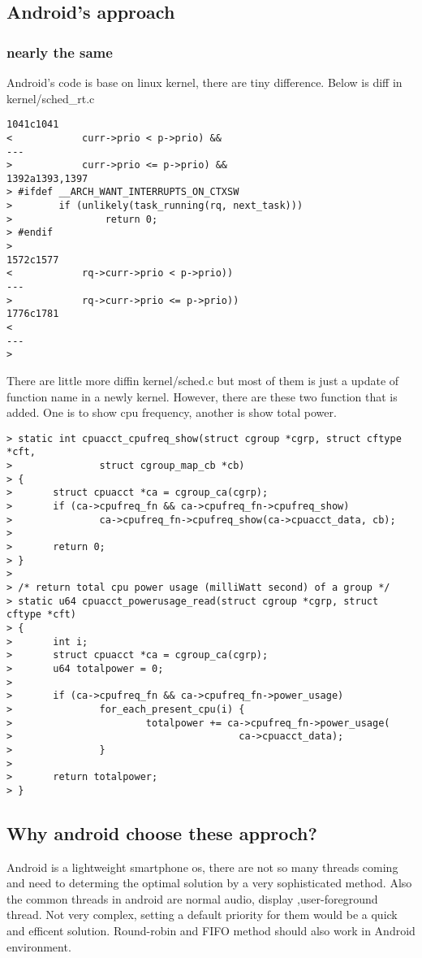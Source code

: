 \documentclass[12pt,letterpaper]{article}
\begin{document}
\subsection{Android's approach}
\subsubsection{nearly the same}
Android's code is base on linux kernel, there are tiny difference. Below is diff in kernel/sched_rt.c
\begin{Verbatim}[frame=single]
1041c1041
<            curr->prio < p->prio) &&
---
>            curr->prio <= p->prio) &&
1392a1393,1397
> #ifdef __ARCH_WANT_INTERRUPTS_ON_CTXSW
>        if (unlikely(task_running(rq, next_task)))
>                return 0;
> #endif
> 
1572c1577
<            rq->curr->prio < p->prio))
---
>            rq->curr->prio <= p->prio))
1776c1781
< 
---
> 
\end{Verbatim}
There are little more diffin kernel/sched.c but most of them is just a update of function name in a newly kernel. However, there are these two function that is added. One is to show cpu frequency, another is show total power.
\begin{Verbatim}[frame=single]
> static int cpuacct_cpufreq_show(struct cgroup *cgrp, struct cftype *cft,
>               struct cgroup_map_cb *cb)
> {
>       struct cpuacct *ca = cgroup_ca(cgrp);
>       if (ca->cpufreq_fn && ca->cpufreq_fn->cpufreq_show)
>               ca->cpufreq_fn->cpufreq_show(ca->cpuacct_data, cb);
>
>       return 0;
> }
>
> /* return total cpu power usage (milliWatt second) of a group */
> static u64 cpuacct_powerusage_read(struct cgroup *cgrp, struct cftype *cft)
> {
>       int i;
>       struct cpuacct *ca = cgroup_ca(cgrp);
>       u64 totalpower = 0;
>
>       if (ca->cpufreq_fn && ca->cpufreq_fn->power_usage)
>               for_each_present_cpu(i) {
>                       totalpower += ca->cpufreq_fn->power_usage(
>                                       ca->cpuacct_data);
>               }
>
>       return totalpower;
> }
\end{Verbatim}
\subsection{Why android choose these approch?}
Android is a lightweight smartphone os, there are not so many threads coming and need to determing the optimal solution by a very sophisticated method. Also the common threads in android are normal audio, display ,user-foreground thread. Not very complex, setting a default priority for them would be a quick and efficent solution. Round-robin and FIFO method should also work in Android environment.
\end{document}
